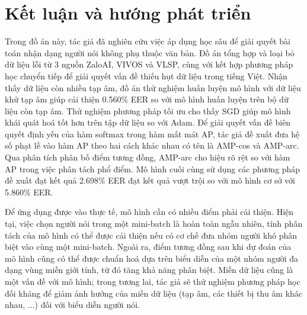 \documentclass[a4paper, 13pt, oneside]{report}
\begin{document}





\chapter{Kết luận và hướng phát triển}
Trong đồ án này, tác giả đã nghiên cứu việc áp dụng học sâu để giải quyết bài toán nhận dạng người nói không phụ thuộc văn bản. Đồ án tổng hợp và loại bỏ dữ liệu lỗi từ 3 nguồn ZaloAI, VIVOS và VLSP, cùng với kết hợp phương pháp học chuyển tiếp để giải quyết vấn đề thiếu hụt dữ liệu trong tiếng Việt. Nhận thấy dữ liệu còn nhiều tạp âm, đồ án thử nghiệm huấn luyện mô hình với dữ liệu khử tạp âm giúp cải thiện 0.560\% EER so với mô hình huấn luyện trên bộ dữ liệu còn tạp âm. Thử nghiệm phương pháp tối ưu cho thấy SGD giúp mô hình khái quát hoá tốt hơn trên tập dữ liệu so với Adam. Để giải quyết vấn đề biên quyết định yếu của hàm softmax trong hàm mất mát AP, tác giả đề xuất đưa hệ số phạt lề vào hàm AP theo hai cách khác nhau có tên là AMP-cos và AMP-arc. Qua phân tích phân bố điểm tương đồng, AMP-arc cho hiệu rõ rệt so với hàm AP trong việc phân tách phổ điểm. Mô hình cuối cùng sử dụng các phương pháp đề xuất đạt kết quả 2.698\% EER đạt kết quả vượt trội so với mô hình cơ sở với 5.860\% EER.

Để ứng dụng được vào thực tế, mô hình cần có nhiều điểm phải cải thiện. Hiện tại, việc chọn người nói trong một mini-batch là hoàn toàn ngẫu nhiên, tính phân tách của mô hình có thể được cải thiện nếu có cơ chế đưa nhóm người khó phân biệt vào cùng một mini-batch. Ngoài ra, điểm tương đồng sau khi dự đoán của mô hình cũng có thể được chuẩn hoá dựa trên biểu diễn của một nhóm người đa dạng vùng miền giới tính, từ đó tăng khả năng phân biệt. Miền dữ liệu cũng là một vấn đề với mô hình; trong tương lai, tác giả sẽ thử nghiệm phương pháp học đối kháng để giảm ảnh hưởng của miền dữ liệu (tạp âm, các thiết bị thu âm khác nhau, ...) đối với biểu diễn người nói.

\pagebreak



\end{document}
